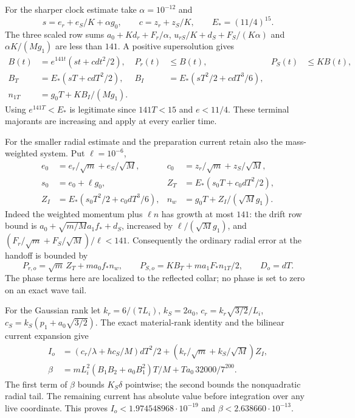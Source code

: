 \documentclass[11pt]{article}
\theoremstyle{definition}\newtheorem{definition}[theorem]{Definition}
\theoremstyle{remark}\newtheorem{remark}[theorem]{Remark}
\begin{document}
For the sharper clock estimate take $\alpha=10^{-12}$ and
\[
 s=e_r+e_S/K+\alpha g_0,\qquad c=z_r+z_S/K,\qquad E_*=(11/4)^{15}.
\]
The three scaled row sums
$a_0+Kd_r+F_r/\alpha$, $u_{rS}/K+d_S+F_S/(K\alpha)$ and
$\alpha K/(Mg_1)$ are less than $141$. A positive supersolution gives
\begin{align}
 B(t)&=e^{141t}(st+cdt^2/2),&
 P_r(t)&\le B(t),&P_S(t)&\le KB(t),\\
 B_T&=E_*(sT+cdT^2/2),&
 B_I&=E_*(sT^2/2+cdT^3/6),\\
 n_{1T}&=g_0T+KB_I/(Mg_1). \label{prep:anisotropic}
\end{align}
Using $e^{141T}<E_*$ is legitimate since $141T<15$ and $e<11/4$.
These terminal majorants are increasing and apply at every earlier time.

For the smaller radial estimate and the preparation current retain also
the mass-weighted system. Put $\ell=10^{-6}$,
\begin{align*}
 e_0&=e_r/\sqrt m+e_S/\sqrt M,&
 c_0&=z_r/\sqrt m+z_S/\sqrt M,\\
 s_0&=e_0+\ell g_0,&
 Z_T&=E_*(s_0T+c_0dT^2/2),\\
 Z_I&=E_*(s_0T^2/2+c_0dT^3/6),&
 n_w&=g_0T+Z_I/(\sqrt M g_1).
\end{align*}
Indeed the weighted momentum plus $\ell n$ has growth at most $141$:
the drift row bound is
$a_0+\sqrt{m/M}a_1f_*+d_S$, increased by
$\ell/(\sqrt M g_1)$, and
$(F_r/\sqrt m+F_S/\sqrt M)/\ell<141$.
Consequently the ordinary radial error at the handoff is bounded by
\begin{equation}
 P_{r,o}=\sqrt m\,Z_T+ma_0f_*n_w,
 \qquad P_{S,o}=KB_T+ma_1F_*n_{1T}/2,
 \qquad D_o=dT. \label{prep:old-handoff}
\end{equation}
The phase terms here are localized to the reflected collar; no phase is
set to zero on an exact wave tail.

For the Gaussian rank let
$k_r=6/(7L_i)$, $k_S=2a_0$,
$c_r=k_r\sqrt{3/2}/L_i$, $c_S=k_S(p_1+a_0\sqrt{3/2})$.
The exact material-rank identity and the bilinear current expansion give
\begin{align}
 I_o&=(c_r/\lambda+\hbar c_S/M)dT^2/2
       +(k_r/\sqrt m+k_S/\sqrt M)Z_I,\\
 \beta&=mL_i^2(B_1B_2+a_0B_1^2)T/M
                   +Ta_0\,32000/7^{200}. \label{prep:old-current}
\end{align}
The first term of $\beta$ bounds $K_S\delta$ pointwise; the second
bounds the nonquadratic radial tail. The remaining current has absolute
value before integration over any live coordinate. This proves
$I_o<1.974548968\cdot10^{-19}$ and $\beta<2.638660\cdot10^{-13}$.
\end{document}
